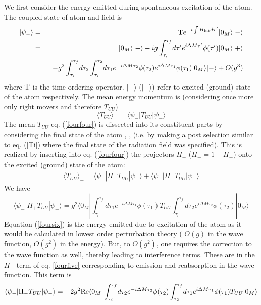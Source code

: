 \documentclass[12pt,oneside]{report}
\def\ket#1{|#1\rangle}
\def\elematrice#1#2#3{\langle #1|#2|#3 \rangle}
\begin{document}
We first consider the 
energy emitted during spontaneous excitation of the atom.
The coupled state of atom and field is
\begin{eqnarray}
\ket{\psi_-} &=& { \rm T} e^{-i\int H_{\rm int} d\tau^\prime} \ket{0_M}\ket{-}
\nonumber\\
&=& \ket{0_M}\ket{-} -ig \int_{\tau_i}^{\tau_f} \! d\tau^\prime
e^{i \Delta M \tau^\prime} \phi(\tau^\prime) \ket{0_M}\ket{+} \nonumber\\
&\ &\ \  -g^2 \int_{\tau_i}^{\tau_f} \! d\tau_2 \int_{\tau_i}^{\tau_2} \!
d\tau_1 e^{-i \Delta M \tau_2} \phi(\tau_2)
e^{i \Delta M \tau_1} \phi(\tau_1) \ket{0_M}\ket{-} + O(g^3)
\nonumber\\
\label{fourthree}
\end{eqnarray}
where ${\rm T}$ is the time ordering operator. $\ket{+}$ ($\ket{-}$)
 refer to excited
(ground) state of the atom respectively. The mean energy momentum is
(considering once more only right movers and therefore $T_{UU}$)
\begin{equation}
\langle T_{UU} \rangle _- = \elematrice{\psi_-}{ T_{UU} }{\psi_-}
\label{fourfour}\end{equation}
The mean $T_{UU}$ eq. (\ref{fourfour}) is dissected into its constituent parts by
considering the final state of the atom  \cite{UnWa},  \cite{Grow},
 \cite{MaPa} (i.e. by making a post selection similar to eq. (\ref{Ti}) where
the final state of the radiation field was specified).
This is
realized by inserting into  eq. (\ref{fourfour}) the projectors $\Pi_+$ ($\Pi_-
=1-\Pi_+$) onto the
excited (ground) state of the atom:
\begin{eqnarray}
\langle T_{UU} \rangle _- =
\elematrice{\psi_-} {\Pi_+ T_{UU} }{\psi_-}  
+ \elematrice{\psi_-} { \Pi_- T_{UU}
}{\psi_-}
\label{fourfive}
\end{eqnarray}
We have
\begin{equation} 
\elematrice{\psi_-} {\Pi_+ T_{UU} }{\psi_-}
=
g^2 \elematrice {0_M} { \int_{\tau_i}^{\tau_f} \! d\tau_1
e^{ -i \Delta M \tau_1} \phi(\tau_1) T_{UU}
\int_{\tau_i}^{\tau_f} \! d\tau_2
e^{i \Delta M \tau_2} \phi(\tau_2) }{0_M}
\label{foursix}
\end{equation}
Equation (\ref{foursix}) is the energy emitted due to excitation of the atom
as it would be calculated in lowest order perturbation theory (
$O(g)$ in the wave function, $O(g^2)$ in the energy). But, to $O(g^2)$,
one requires the correction to the wave function as well, thereby leading
to interference terms. These are in the $\Pi_-$ term of eq.
\ref{fourfive} corresponding to emission and reabsorption in the wave
function. This term is 
\begin{equation} 
\elematrice{\psi_-} {\Pi_- T_{UU} }{\psi_-}
=
-2 g^2 {\rm Re} \elematrice {0_M} { \int_{\tau_i}^{\tau_f} \! d\tau_2
e^{ -i \Delta M \tau_2} \phi(\tau_2) 
\int_{\tau_2}^{\tau_f} \! d\tau_1
e^{i \Delta M \tau_1} \phi(\tau_1)  T_{UU}}{0_M}
\label{fourseven}
\end{equation}
\end{document}
